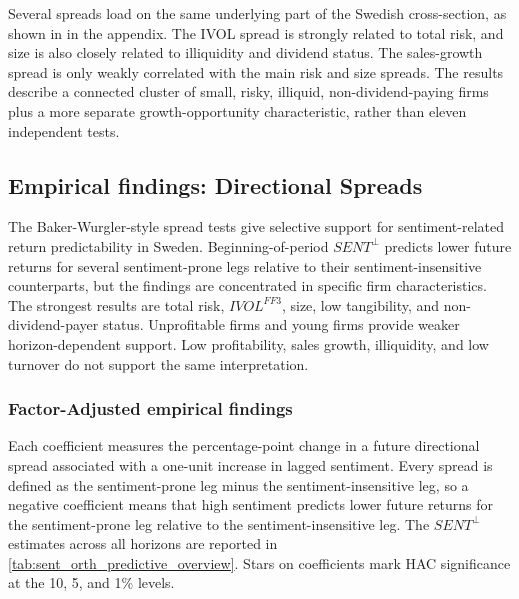 \documentclass[11pt]{article}
\newcommand{\var}[1]{\ensuremath{#1}}
\begin{document}
Several spreads load on the same underlying part of the Swedish cross-section, as shown in  in the appendix. The IVOL spread is strongly related to total risk, and size is also closely related to illiquidity and dividend status. The sales-growth spread is only weakly correlated with the main risk and size spreads. The results describe a connected cluster of small, risky, illiquid, non-dividend-paying firms plus a more separate growth-opportunity characteristic, rather than eleven independent tests.

\subsection{Empirical findings: Directional Spreads}
The Baker-Wurgler-style spread tests give selective support for sentiment-related return predictability in Sweden. Beginning-of-period \var{SENT^{\perp}} predicts lower future returns for several sentiment-prone legs relative to their sentiment-insensitive counterparts, but the findings are concentrated in specific firm characteristics. The strongest results are total risk, \var{IVOL^{FF3}}, size, low tangibility, and non-dividend-payer status. Unprofitable firms and young firms provide weaker horizon-dependent support. Low profitability, sales growth, illiquidity, and low turnover do not support the same interpretation.

\subsubsection{Factor-Adjusted empirical findings}
Each coefficient measures the percentage-point change in a future directional spread associated with a one-unit increase in lagged sentiment. Every spread is defined as the sentiment-prone leg minus the sentiment-insensitive leg, so a negative coefficient means that high sentiment predicts lower future returns for the sentiment-prone leg relative to the sentiment-insensitive leg. The \var{SENT^{\perp}} estimates across all horizons are reported in \cref{tab:sent_orth_predictive_overview}. Stars on coefficients mark HAC significance at the 10, 5, and 1\% levels.
\end{document}
